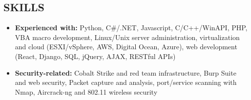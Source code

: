 \documentclass[line]{res}
\begin{document}
\begin{resume}
\section{SKILLS}
\begin{itemize}
	\item \textbf{Experienced with:} Python, C\#/.NET, Javascript, C/C++/WinAPI, PHP, VBA macro development, Linux/Unix server administration, virtualization and cloud (ESXI/vSphere, AWS, Digital Ocean, Azure), web development (React, Django, SQL, jQuery, AJAX, RESTful APIs)
	\item \textbf{Security-related:} Cobalt Strike and red team infrastructure, Burp Suite and web security, Packet capture and analysis, port/service scanning with Nmap, Aircrack-ng and 802.11 wireless security
\end{itemize}

\end{resume}
\end{document}
